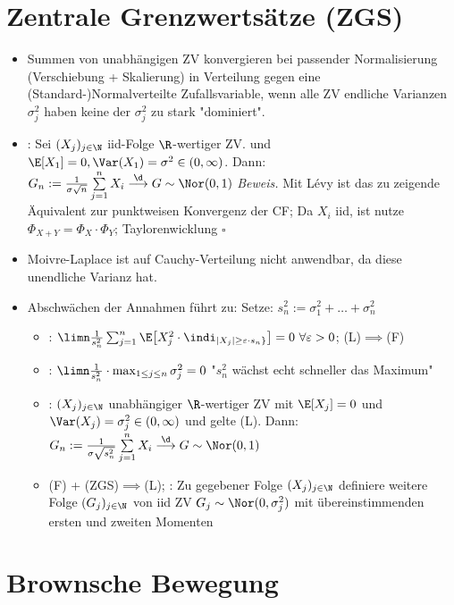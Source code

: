 	\section{Zentrale Grenzwertsätze (ZGS)}
	
	\begin{itemize}
		\item Summen von unabhängigen ZV konvergieren bei passender Normalisierung (Verschiebung + Skalierung) in Verteilung gegen eine (Standard-)Normalverteilte Zufallsvariable, wenn alle ZV endliche Varianzen $\sigma_j^2$ haben  keine der $\sigma_j^2$ zu stark "dominiert".
		\item {}: Sei $(X_j)_{j\in\N}$ iid-Folge $\R$-wertiger ZV. und $\E[X_1]=0,\Var(X_1)=\sigma^2\in(0,\infty)$. Dann: $G_n:=\frac{1}{\sigma\sqrt{n}}\sum\limits_{j=1}^n X_i\overset{\d}{\longrightarrow} G\sim\Nor(0,1)$
		\textit{Beweis.} Mit Lévy ist das zu zeigende Äquivalent zur punktweisen Konvergenz der CF; Da $X_i$ iid, ist nutze $\Phi_{X+Y}=\Phi_X\cdot\Phi_Y$; Taylorenwicklung $\square$
		\item Moivre-Laplace ist auf Cauchy-Verteilung nicht anwendbar, da diese unendliche Varianz hat.
		\item Abschwächen der Annahmen führt zu:  Setze: $s_n^2:=\sigma_1^2+\ldots+\sigma_n^2$
		\begin{itemize}
			\item {}: $\limn\frac{1}{s_n^2}\sum_{j=1}^n\E\big[X_j^2\cdot\indi_{|X_j|\geq\varepsilon\cdot s_n\rbrace}\big]=0~\forall\varepsilon>0$; (L)$\implies$(F)
			\item {}: $\limn\frac{1}{s_n^2}\cdot\max_{1\leq j\leq n}\sigma_j^2=0$
			"$s_n^2$ wächst echt schneller das Maximum"
			\item {}: $(X_j)_{j\in\N}$ unabhängiger $\R$-wertiger ZV mit $\E[X_j]=0$ und $\Var(X_j)=\sigma_j^2\in(0,\infty)$ und gelte (L).
			Dann: $G_n:=\frac{1}{\sigma\sqrt{s_n^2}}\sum\limits_{j=1}^n X_i\overset{\d}{\longrightarrow} G\sim\Nor(0,1)$
			\item (F) + (ZGS)$\implies$(L); : Zu gegebener Folge $(X_j)_{j\in\N}$ definiere weitere Folge $(G_j)_{j\in\N}$ von iid ZV $G_j\sim\Nor(0,\sigma_j^2)$ mit übereinstimmenden ersten und zweiten Momenten
		\end{itemize}
	\end{itemize}
	
	\section{Brownsche Bewegung}
	
